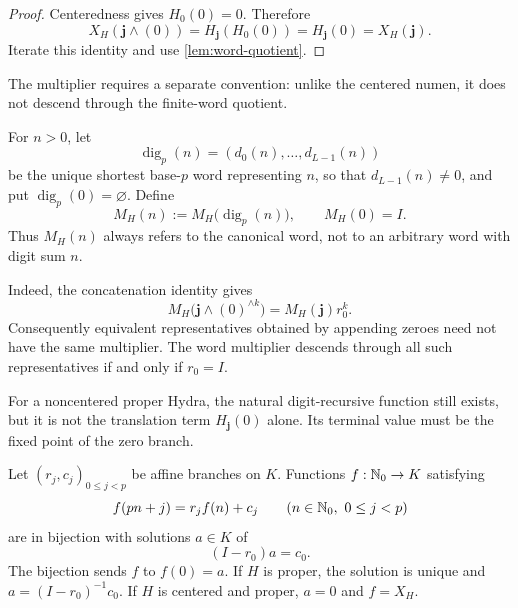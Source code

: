 \begin{proof}
Centeredness gives $H_0(0)=0$.  Therefore
\[
 X_H(\mathbf j\wedge(0))
 =H_{\mathbf j}(H_0(0))=H_{\mathbf j}(0)=X_H(\mathbf j).
\]
Iterate this identity and use \cref{lem:word-quotient}.
\end{proof}

The multiplier requires a separate convention: unlike the centered numen, it
does not descend through the finite-word quotient.

\begin{definition}
\label{def:canonical-integer-multiplier}
For $n>0$, let
\[
 \operatorname{dig}_p(n)=(d_0(n),\ldots,d_{L-1}(n))
\]
be the unique shortest base-$p$ word representing $n$, so that
$d_{L-1}(n)\ne0$, and put $\operatorname{dig}_p(0)=\varnothing$.  Define
\begin{equation}
\label{eq:canonical-integer-multiplier}
 M_H(n):=M_H\bigl(\operatorname{dig}_p(n)\bigr),
 \qquad M_H(0)=I.
\end{equation}
Thus $M_H(n)$ always refers to the canonical word, not to an arbitrary word
with digit sum $n$.
\end{definition}

Indeed, the concatenation identity gives
\[
 M_H\bigl(\mathbf j\wedge(0)^{\wedge k}\bigr)
 =M_H(\mathbf j)r_0^k.
\]
Consequently equivalent representatives obtained by appending zeroes need
not have the same multiplier.  The word multiplier descends through all such
representatives if and only if $r_0=I$.

For a noncentered proper Hydra, the natural digit-recursive function still
exists, but it is not the translation term $H_{\mathbf j}(0)$ alone.  Its
terminal value must be the fixed point of the zero branch.

\begin{theorem}
\label{thm:digit-recursive-characterization}
Let $(r_j,c_j)_{0\leq j<p}$ be affine branches on $K$.  Functions
$f:\mathbb N_0\to K$ satisfying
\begin{equation}
\label{eq:numen-FE-N}
 f(pn+j)=r_jf(n)+c_j
 \qquad(n\in\mathbb N_0,\ 0\leq j<p)
\end{equation}
are in bijection with solutions $a\in K$ of
\begin{equation}
\label{eq:zero-fixed-equation}
 (I-r_0)a=c_0.
\end{equation}
The bijection sends $f$ to $f(0)=a$.  If $H$ is proper, the solution is
unique and $a=(I-r_0)^{-1}c_0$.  If $H$ is centered and proper, $a=0$ and
$f=X_H$.
\end{theorem}

